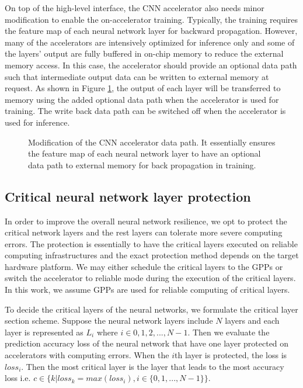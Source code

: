 On top of the high-level interface, the CNN accelerator also needs 
minor modification to enable the on-accelerator training. 
Typically, the training requires the feature map of each neural 
network layer for backward propagation. However, many of the accelerators 
are intensively optimized for inference only and some of the layers’ output 
are fully buffered in on-chip memory to reduce the external memory access. 
In this case, the accelerator should provide an optional data path such that 
intermediate output data can be written to external memory at request.
As shown in Figure \ref{fig:change_of_accelerator}, the output of each layer 
will be transferred to memory using the added optional data path 
when the accelerator is used for training. The write back data path 
can be switched off when the accelerator is used for inference. 

\begin{figure}
        \caption{Modification of the CNN accelerator data path. It essentially
ensures the feature map of each neural network layer to have an optional data path 
to external memory for back propagation in training.}
        \label{fig:change_of_accelerator}
        \vspace{-1em}
\end{figure}

\subsection{Critical neural network layer protection}
In order to improve the overall neural network resilience, we opt to 
protect the critical network layers and the rest layers can tolerate 
more severe computing errors. The protection is essentially 
to have the critical layers executed on reliable computing infrastructures 
and the exact protection method depends on the target hardware platform.
We may either schedule the critical layers to the GPPs or switch the accelerator 
to reliable mode during the execution of the critical layers.
In this work, we assume GPPs are used for reliable computing 
of critical layers. 

To decide the critical layers of the neural networks, we formulate the 
critical layer section scheme. Suppose the neural network layers include 
$N$ layers and each layer is represented as $L_i$ where $i \in {0, 1, 2, ..., N-1}$.
Then we evaluate the prediction accuracy loss of the neural network 
that have one layer protected on accelerators with computing errors.
When the $i$th layer is protected, the loss is $loss_i$.
Then the most critical layer is the layer that leads to the most 
accuracy loss i.e. $c \in \{k|loss_k = max(loss_i), i \in \{0, 1, ..., N-1\}\}$.


